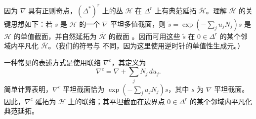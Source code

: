 因为 $\nabla$ 具有正则奇点，$(\Delta^*)^r$ 上的丛 $\mathcal H$ 在 $\Delta^r$ 上有典范延拓 $\overline{\mathcal H}$。理解 $\overline{\mathcal H}$ 的关键思想如下：若 $s$ 是 $\mathcal H$ 的一个 $\nabla$ 平坦多值截面，则 $\widetilde s=\exp(-\sum_ju_jN_j)s$ 是 $\mathcal H$ 的单值截面，并自然延拓为 $\overline{\mathcal H}$ 的截面 。因而可用这些 $\widetilde s$ 在 $0\in\Delta^r$ 的某个邻域内平凡化 $\overline{\mathcal H}$。（我们的符号与  不同，因为这里使用逆时针的单值性生成元。）

一种常见的表述方式是使用联络 $\nabla^c$，其定义为
\begin{equation}\label{eq:a-model-canonical-connection}
\nabla^c=\nabla+\sum_jN_j\,du_j.
\end{equation}
简单计算表明，$\nabla^c$ 平坦截面恰为 $\exp(-\sum_ju_jN_j)s$，其中 $s$ 为 $\nabla$ 平坦截面。因此，$\nabla^c$ 延拓为 $\overline{\mathcal H}$ 上的联络；其平坦截面在边界点 $0\in\Delta^r$ 的某个邻域内平凡化典范延拓。

